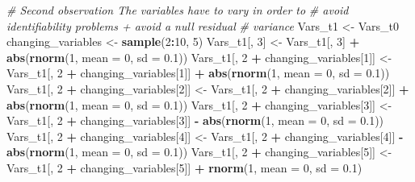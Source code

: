 \documentclass[
]{article}
\newenvironment{Shaded}{\begin{snugshade}}{\end{snugshade}}
\newcommand{\CommentTok}[1]{\textcolor[rgb]{0.56,0.35,0.01}{\textit{#1}}}
\newcommand{\DataTypeTok}[1]{\textcolor[rgb]{0.13,0.29,0.53}{#1}}
\newcommand{\DecValTok}[1]{\textcolor[rgb]{0.00,0.00,0.81}{#1}}
\newcommand{\FloatTok}[1]{\textcolor[rgb]{0.00,0.00,0.81}{#1}}
\newcommand{\KeywordTok}[1]{\textcolor[rgb]{0.13,0.29,0.53}{\textbf{#1}}}
\newcommand{\NormalTok}[1]{#1}
\newcommand{\OperatorTok}[1]{\textcolor[rgb]{0.81,0.36,0.00}{\textbf{#1}}}
\newcommand{\StringTok}[1]{\textcolor[rgb]{0.31,0.60,0.02}{#1}}
\begin{document}
\begin{Shaded}
\begin{Highlighting}[]
\CommentTok{# Second observation The variables have to vary in order to}
\CommentTok{# avoid identifiability problems + avoid a null residual}
\CommentTok{# variance}
\NormalTok{Vars_t1 <-}\StringTok{ }\NormalTok{Vars_t0}
\NormalTok{changing_variables <-}\StringTok{ }\KeywordTok{sample}\NormalTok{(}\DecValTok{2}\OperatorTok{:}\DecValTok{10}\NormalTok{, }\DecValTok{5}\NormalTok{)}
\NormalTok{Vars_t1[, }\DecValTok{3}\NormalTok{] <-}\StringTok{ }\NormalTok{Vars_t1[, }\DecValTok{3}\NormalTok{] }\OperatorTok{+}\StringTok{ }\KeywordTok{abs}\NormalTok{(}\KeywordTok{rnorm}\NormalTok{(}\DecValTok{1}\NormalTok{, }\DataTypeTok{mean =} \DecValTok{0}\NormalTok{, }\DataTypeTok{sd =} \FloatTok{0.1}\NormalTok{))}
\NormalTok{Vars_t1[, }\DecValTok{2} \OperatorTok{+}\StringTok{ }\NormalTok{changing_variables[}\DecValTok{1}\NormalTok{]] <-}\StringTok{ }\NormalTok{Vars_t1[, }\DecValTok{2} \OperatorTok{+}\StringTok{ }\NormalTok{changing_variables[}\DecValTok{1}\NormalTok{]] }\OperatorTok{+}\StringTok{ }
\StringTok{    }\KeywordTok{abs}\NormalTok{(}\KeywordTok{rnorm}\NormalTok{(}\DecValTok{1}\NormalTok{, }\DataTypeTok{mean =} \DecValTok{0}\NormalTok{, }\DataTypeTok{sd =} \FloatTok{0.1}\NormalTok{))}
\NormalTok{Vars_t1[, }\DecValTok{2} \OperatorTok{+}\StringTok{ }\NormalTok{changing_variables[}\DecValTok{2}\NormalTok{]] <-}\StringTok{ }\NormalTok{Vars_t1[, }\DecValTok{2} \OperatorTok{+}\StringTok{ }\NormalTok{changing_variables[}\DecValTok{2}\NormalTok{]] }\OperatorTok{+}\StringTok{ }
\StringTok{    }\KeywordTok{abs}\NormalTok{(}\KeywordTok{rnorm}\NormalTok{(}\DecValTok{1}\NormalTok{, }\DataTypeTok{mean =} \DecValTok{0}\NormalTok{, }\DataTypeTok{sd =} \FloatTok{0.1}\NormalTok{))}
\NormalTok{Vars_t1[, }\DecValTok{2} \OperatorTok{+}\StringTok{ }\NormalTok{changing_variables[}\DecValTok{3}\NormalTok{]] <-}\StringTok{ }\NormalTok{Vars_t1[, }\DecValTok{2} \OperatorTok{+}\StringTok{ }\NormalTok{changing_variables[}\DecValTok{3}\NormalTok{]] }\OperatorTok{-}\StringTok{ }
\StringTok{    }\KeywordTok{abs}\NormalTok{(}\KeywordTok{rnorm}\NormalTok{(}\DecValTok{1}\NormalTok{, }\DataTypeTok{mean =} \DecValTok{0}\NormalTok{, }\DataTypeTok{sd =} \FloatTok{0.1}\NormalTok{))}
\NormalTok{Vars_t1[, }\DecValTok{2} \OperatorTok{+}\StringTok{ }\NormalTok{changing_variables[}\DecValTok{4}\NormalTok{]] <-}\StringTok{ }\NormalTok{Vars_t1[, }\DecValTok{2} \OperatorTok{+}\StringTok{ }\NormalTok{changing_variables[}\DecValTok{4}\NormalTok{]] }\OperatorTok{-}\StringTok{ }
\StringTok{    }\KeywordTok{abs}\NormalTok{(}\KeywordTok{rnorm}\NormalTok{(}\DecValTok{1}\NormalTok{, }\DataTypeTok{mean =} \DecValTok{0}\NormalTok{, }\DataTypeTok{sd =} \FloatTok{0.1}\NormalTok{))}
\NormalTok{Vars_t1[, }\DecValTok{2} \OperatorTok{+}\StringTok{ }\NormalTok{changing_variables[}\DecValTok{5}\NormalTok{]] <-}\StringTok{ }\NormalTok{Vars_t1[, }\DecValTok{2} \OperatorTok{+}\StringTok{ }\NormalTok{changing_variables[}\DecValTok{5}\NormalTok{]] }\OperatorTok{+}\StringTok{ }
\StringTok{    }\KeywordTok{rnorm}\NormalTok{(}\DecValTok{1}\NormalTok{, }\DataTypeTok{mean =} \DecValTok{0}\NormalTok{, }\DataTypeTok{sd =} \FloatTok{0.1}\NormalTok{)}
\end{Highlighting}
\end{Shaded}
\end{document}
